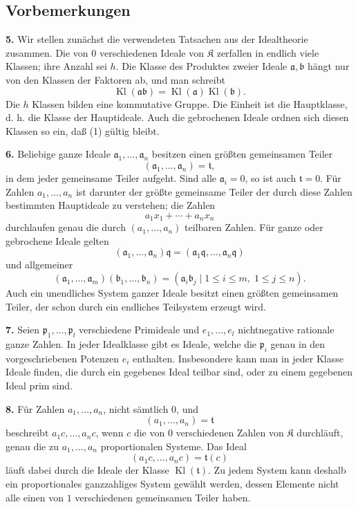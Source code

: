 \documentclass[11pt,a4paper]{article}
\newcommand{\K}{\mathfrak K}
\newcommand{\Kl}{\operatorname{Kl}}
\begin{document}
\subsection*{Vorbemerkungen}

\textbf{5.} Wir stellen zunächst die verwendeten Tatsachen aus der Idealtheorie zusammen. Die von \(0\) verschiedenen Ideale von \(\K\) zerfallen in endlich viele Klassen; ihre Anzahl sei \(h\). Die Klasse des Produktes zweier Ideale \(\mathfrak a,\mathfrak b\) hängt nur von den Klassen der Faktoren ab, und man schreibt
\[
 \Kl(\mathfrak a\mathfrak b)=\Kl(\mathfrak a)\Kl(\mathfrak b). \tag{1}
\]
Die \(h\) Klassen bilden eine kommutative Gruppe. Die Einheit ist die Hauptklasse, d. h. die Klasse der Hauptideale. Auch die gebrochenen Ideale ordnen sich diesen Klassen so ein, daß (1) gültig bleibt.

\textbf{6.} Beliebige ganze Ideale \(\mathfrak a_1,\ldots,\mathfrak a_n\) besitzen einen größten gemeinsamen Teiler
\[
 (\mathfrak a_1,\ldots,\mathfrak a_n)=\mathfrak t,
\]
in dem jeder gemeinsame Teiler aufgeht. Sind alle \(\mathfrak a_i=0\), so ist auch \(\mathfrak t=0\). Für Zahlen \(a_1,\ldots,a_n\) ist darunter der größte gemeinsame Teiler der durch diese Zahlen bestimmten Hauptideale zu verstehen; die Zahlen
\[
 a_1x_1+\cdots+a_nx_n
\]
durchlaufen genau die durch \((a_1,\ldots,a_n)\) teilbaren Zahlen. Für ganze oder gebrochene Ideale gelten
\[
 (\mathfrak a_1,\ldots,\mathfrak a_n)\mathfrak q
   =(\mathfrak a_1\mathfrak q,\ldots,\mathfrak a_n\mathfrak q) \tag{2}
\]
und allgemeiner
\[
 (\mathfrak a_1,\ldots,\mathfrak a_m)(\mathfrak b_1,\ldots,\mathfrak b_n)
 =(\mathfrak a_i\mathfrak b_j\mid 1\leq i\leq m,\;1\leq j\leq n). \tag{3}
\]
Auch ein unendliches System ganzer Ideale besitzt einen größten gemeinsamen Teiler, der schon durch ein endliches Teilsystem erzeugt wird.

\textbf{7.} Seien \(\mathfrak p_1,\ldots,\mathfrak p_l\) verschiedene Primideale und \(e_1,\ldots,e_l\) nichtnegative rationale ganze Zahlen. In jeder Idealklasse gibt es Ideale, welche die \(\mathfrak p_i\) genau in den vorgeschriebenen Potenzen \(e_i\) enthalten. Insbesondere kann man in jeder Klasse Ideale finden, die durch ein gegebenes Ideal teilbar sind, oder zu einem gegebenen Ideal prim sind.

\textbf{8.} Für Zahlen \(a_1,\ldots,a_n\), nicht sämtlich \(0\), und
\[
 (a_1,\ldots,a_n)=\mathfrak t
\]
beschreibt \(a_1c,\ldots,a_nc\), wenn \(c\) die von \(0\) verschiedenen Zahlen von \(\K\) durchläuft, genau die zu \(a_1,\ldots,a_n\) proportionalen Systeme. Das Ideal
\[
 (a_1c,\ldots,a_nc)=\mathfrak t(c)
\]
läuft dabei durch die Ideale der Klasse \(\Kl(\mathfrak t)\). Zu jedem System kann deshalb ein proportionales ganzzahliges System gewählt werden, dessen Elemente nicht alle einen von \(1\) verschiedenen gemeinsamen Teiler haben.
\end{document}
